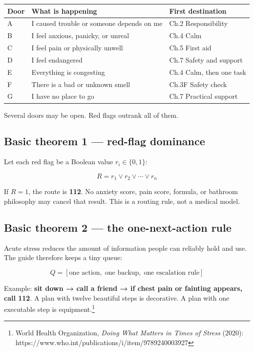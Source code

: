 \begin{longtable}[]{@{}lll@{}}
\toprule\noalign{}
Door & What is happening & First destination \\
\midrule\noalign{}
\endhead
\bottomrule\noalign{}
\endlastfoot
A & I caused trouble or someone depends on me & Ch.2 Responsibility \\
B & I feel anxious, panicky, or unreal & Ch.4 Calm \\
C & I feel pain or physically unwell & Ch.5 First aid \\
D & I feel endangered & Ch.7 Safety and support \\
E & Everything is congesting & Ch.4 Calm, then one task \\
F & There is a bad or unknown smell & Ch.3F Safety check \\
G & I have no place to go & Ch.7 Practical support \\
\end{longtable}

Several doors may be open. Red flags outrank all of them.

\hypertarget{basic-theorem-1-red-flag-dominance}{%
\subsection{Basic theorem 1 --- red-flag
dominance}\label{basic-theorem-1-red-flag-dominance}}

Let each red flag be a Boolean value \(r_i \in \{0,1\}\):

\[R = r_1 \lor r_2 \lor \cdots \lor r_n\]

If \(R=1\), the route is \textbf{112}. No anxiety score, pain score,
formula, or bathroom philosophy may cancel that result. This is a
routing rule, not a medical model.

\hypertarget{basic-theorem-2-the-one-next-action-rule}{%
\subsection{Basic theorem 2 --- the one-next-action
rule}\label{basic-theorem-2-the-one-next-action-rule}}

Acute stress reduces the amount of information people can reliably hold
and use. The guide therefore keeps a tiny queue:

\[Q = [\text{one action},\; \text{one backup},\; \text{one escalation rule}]\]

Example: \textbf{sit down → call a friend → if chest pain or fainting
appears, call 112}. A plan with twelve beautiful steps is decorative. A
plan with one executable step is equipment.\footnote{World Health
  Organization, \emph{Doing What Matters in Times of Stress} (2020):
  https://www.who.int/publications/i/item/9789240003927}


